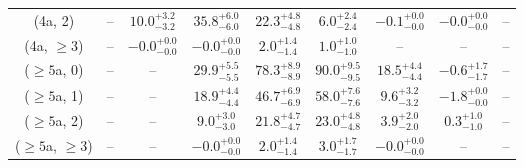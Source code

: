 \begin{table}[h!]
{\begin{tabular}{ccccccccc}
	(4a, 2) & -- & $10.0^{+ 3.2 }_{- 3.2 }$ & $35.8^{+ 6.0 }_{- 6.0 }$ & $22.3^{+ 4.8 }_{- 4.8 }$ & $6.0^{+ 2.4 }_{- 2.4 }$ & $-0.1^{+ 0.0 }_{- 0.0 }$ & $-0.0^{+ 0.0 }_{- 0.0 }$ & -- \\[0.5ex] 
	(4a, $\ge3$) & -- & $-0.0^{+ 0.0 }_{- 0.0 }$ & $-0.0^{+ 0.0 }_{- 0.0 }$ & $2.0^{+ 1.4 }_{- 1.4 }$ & $1.0^{+ 1.0 }_{- 1.0 }$ & -- & -- & -- \\[0.5ex] 
	($\ge5$a, 0) & -- & -- & $29.9^{+ 5.5 }_{- 5.5 }$ & $78.3^{+ 8.9 }_{- 8.9 }$ & $90.0^{+ 9.5 }_{- 9.5 }$ & $18.5^{+ 4.4 }_{- 4.4 }$ & $-0.6^{+ 1.7 }_{- 1.7 }$ & -- \\[0.5ex] 
	($\ge5$a, 1) & -- & -- & $18.9^{+ 4.4 }_{- 4.4 }$ & $46.7^{+ 6.9 }_{- 6.9 }$ & $58.0^{+ 7.6 }_{- 7.6 }$ & $9.6^{+ 3.2 }_{- 3.2 }$ & $-1.8^{+ 0.0 }_{- 0.0 }$ & -- \\[0.5ex] 
	($\ge5$a, 2) & -- & -- & $9.0^{+ 3.0 }_{- 3.0 }$ & $21.8^{+ 4.7 }_{- 4.7 }$ & $23.0^{+ 4.8 }_{- 4.8 }$ & $3.9^{+ 2.0 }_{- 2.0 }$ & $0.3^{+ 1.0 }_{- 1.0 }$ & -- \\[0.5ex] 
	($\ge5$a, $\ge3$) & -- & -- & $-0.0^{+ 0.0 }_{- 0.0 }$ & $2.0^{+ 1.4 }_{- 1.4 }$ & $3.0^{+ 1.7 }_{- 1.7 }$ & $-0.0^{+ 0.0 }_{- 0.0 }$ & -- & -- \\[0.5ex] 
	\hline
	\hline
\end{tabular}}
\end{table}
